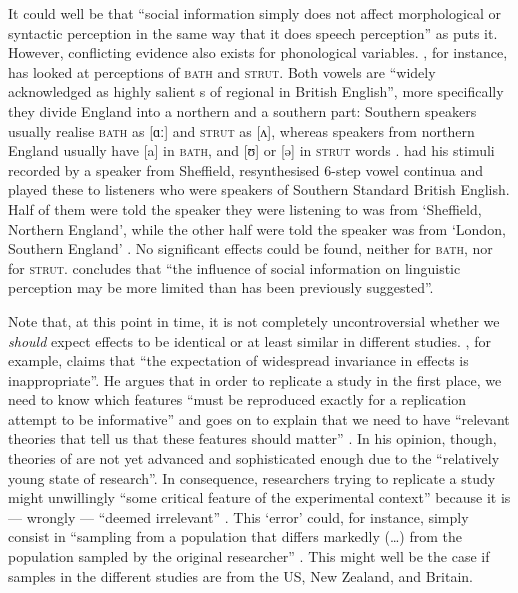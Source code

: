 It could well be that ``social information simply does not affect morphological or syntactic perception in the same way that it does speech perception'' as \textcite[229]{squires2013} puts it.
However, conflicting evidence also exists for phonological variables.
\textcite{lawrence2015}, for instance, has looked at perceptions of \textsc{bath} and \textsc{strut}.
Both vowels are ``widely acknowledged as highly salient s of regional  in British English'', more specifically they divide England into a northern and a southern part: Southern speakers usually realise \textsc{bath} as [ɑː] and \textsc{strut} as [ʌ], whereas speakers from northern England usually have [a] in \textsc{bath}, and [ʊ] or [ə] in \textsc{strut} words \parencite[cf.][1]{lawrence2015}.
\citeauthor{lawrence2015} had his stimuli recorded by a speaker from Sheffield, resynthesised 6-step vowel continua and played these to listeners who were speakers of Southern Standard British English.
Half of them were told the speaker they were listening to was from `Sheffield, Northern England', while the other half were told the speaker was from `London, Southern England' \parencite[cf.][2--3]{lawrence2015}.
No significant  effects could be found, neither for \textsc{bath}, nor for \textsc{strut}.
\textcite[cf.][4]{lawrence2015} concludes that ``the influence of social information on linguistic perception may be more limited than has been previously suggested''.

Note that, at this point in time, it is not completely uncontroversial whether we \emph{should} expect  effects to be identical or at least similar in different studies.
\textcite[45]{cesario2014}, for example, claims that ``the expectation of widespread invariance in  effects is inappropriate''.
He argues that in order to replicate a study in the first place, we need to know which features ``must be reproduced exactly for a replication attempt to be informative'' and goes on to explain that we need to have ``relevant theories that tell us that these features should matter'' \parencite[42]{cesario2014}.
In his opinion, though, theories of  are not yet advanced and sophisticated enough due to the ``relatively young state of  research''.
In consequence, researchers trying to replicate a study might unwillingly  ``some critical feature of the experimental context'' because it is --- wrongly --- ``deemed irrelevant'' \parencite[43]{cesario2014}.
This `error' could, for instance, simply consist in ``sampling from a population that differs markedly (\ldots) from the population sampled by the original researcher'' \parencite[43]{cesario2014}.
This might well be the case if samples in the different studies are from the US, New Zealand, and Britain.

